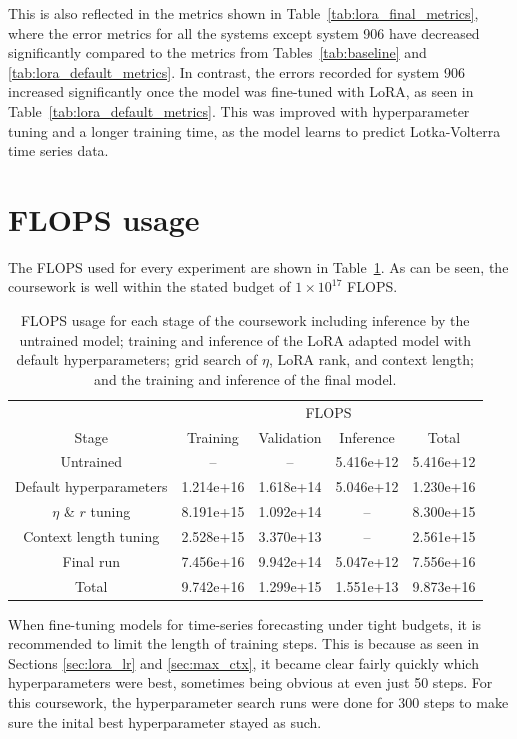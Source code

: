 \documentclass[11pt,a4paper]{article}
\begin{document}
This is also reflected in the metrics shown in Table~\ref{tab:lora_final_metrics}, where the error metrics for all the systems except system 906 have decreased significantly compared to the metrics from Tables~\ref{tab:baseline} and \ref{tab:lora_default_metrics}. In contrast, the errors recorded for system 906 increased significantly once the model was fine-tuned with LoRA, as seen in Table~\ref{tab:lora_default_metrics}. This was improved with hyperparameter tuning and a longer training time, as the model learns to predict Lotka-Volterra time series data. 

\section{FLOPS usage}

The FLOPS used for every experiment are shown in Table~\ref{tab:flops_track}. As can be seen, the coursework is well within the stated budget of $1 \times 10^{17}$ FLOPS.

\begin{table}[h]
    \centering
    \begin{tabular}{c|c|c|c|c}
        & \multicolumn{4}{|c}{FLOPS}\\
        Stage & Training & Validation & Inference & Total \\
        \hline
        Untrained & -- & -- & 5.416e+12 & 5.416e+12 \\
        Default hyperparameters & 1.214e+16 & 1.618e+14 & 5.046e+12 & 1.230e+16 \\
        $\eta$ \& $r$ tuning & 8.191e+15 & 1.092e+14 & -- & 8.300e+15 \\
        Context length tuning & 2.528e+15 & 3.370e+13 & -- & 2.561e+15 \\
        Final run & 7.456e+16 & 9.942e+14 & 5.047e+12 & 7.556e+16 \\
        \hline
        Total & 9.742e+16 & 1.299e+15 & 1.551e+13 & 9.873e+16 \\
    \end{tabular}
    \caption{FLOPS usage for each stage of the coursework including inference by the untrained model; training and inference of the LoRA adapted model with default hyperparameters; grid search of $\eta$, LoRA rank, and context length; and the training and inference of the final model.}
    \label{tab:flops_track}
\end{table}

When fine-tuning models for time-series forecasting under tight budgets, it is recommended to limit the length of training steps. This is because as seen in Sections \ref{sec:lora_lr} and \ref{sec:max_ctx}, it became clear fairly quickly which hyperparameters were best, sometimes being obvious at even just 50 steps. For this coursework, the hyperparameter search runs were done for 300 steps to make sure the inital best hyperparameter stayed as such.
\end{document}
